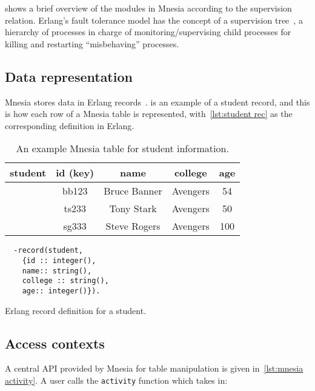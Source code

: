  shows a brief overview of the modules in Mnesia according
to the supervision relation.
Erlang's fault tolerance model has the concept of a supervision tree~\cite{ericssonab2023otpdesign},
a hierarchy of processes in charge of monitoring/supervising child processes
for killing and restarting ``misbehaving'' processes. 

\subsection{Data representation} \label{subsec:bg mnesia data repr}

Mnesia stores data in Erlang records~\cite{ericssonab2023stdlib}.
 is an example of a student record, and this is how each row 
of a Mnesia table is represented, with~\cref{lst:student rec} as the corresponding definition
in Erlang.


\begin{table}[htp]
\centering
\begin{tabular}{ccccc}
  \toprule
  student & id (key) & name & college & age \\ 
  \midrule
  & bb123 & Bruce Banner & Avengers & 54 \\
  & ts233 & Tony Stark & Avengers & 50 \\
  & sg333 & Steve Rogers & Avengers & 100 \\
  \bottomrule
\end{tabular}
\caption{An example Mnesia table for student information.}
\label{tab:erl record}
\end{table}

\begin{listing}[htp]
\centering
\begin{verbatim}
  -record(student, 
    {id :: integer(), 
    name:: string(), 
    college :: string(),
    age:: integer()}).
\end{verbatim}
\caption{Erlang record definition for a student.} 
\label{lst:student rec}
\end{listing}




\subsection{Access contexts} \label{subsec:mnesia access contexts}

A central API provided by Mnesia for table manipulation is given in~\cref{lst:mnesia activity}.
A user calls the \texttt{activity} function which takes in: 

